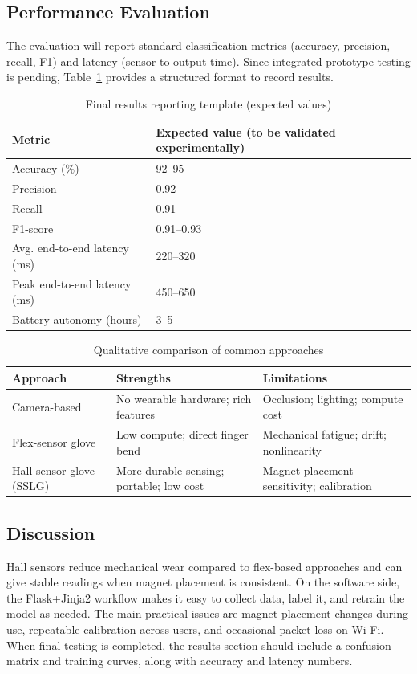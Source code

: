 \documentclass[conference]{IEEEtran}
\begin{document}
\subsection{Performance Evaluation}
The evaluation will report standard classification metrics (accuracy, precision, recall, F1) and latency (sensor-to-output time). Since integrated prototype testing is pending, Table~\ref{tab:metrics} provides a structured format to record results.

\begin{table}[htbp]
    \centering
    \caption{Final results reporting template (expected values)}
    \begin{tabularx}{\columnwidth}{@{}lX@{}}
        \toprule
        Metric & Expected value (to be validated experimentally) \\
        \midrule
        Accuracy (\%) & 92--95 \\
        Precision & 0.92 \\
        Recall & 0.91 \\
        F1-score & 0.91--0.93 \\
        Avg. end-to-end latency (ms) & 220--320 \\
        Peak end-to-end latency (ms) & 450--650 \\
        Battery autonomy (hours) & 3--5 \\
        \bottomrule
    \end{tabularx}
    \label{tab:metrics}
\end{table}

\begin{table}[htbp]
    \centering
    \caption{Qualitative comparison of common approaches}
    \begin{tabularx}{\columnwidth}{@{}lXX@{}}
        \toprule
        Approach & Strengths & Limitations \\
        \midrule
        Camera-based & No wearable hardware; rich features & Occlusion; lighting; compute cost\cite{mitra} \\
        Flex-sensor glove & Low compute; direct finger bend & Mechanical fatigue; drift; nonlinearity \\
        Hall-sensor glove (SSLG) & More durable sensing; portable; low cost & Magnet placement sensitivity; calibration \\
        \bottomrule
    \end{tabularx}
    \label{tab:comparison}
\end{table}

\subsection{Discussion}
Hall sensors reduce mechanical wear compared to flex-based approaches and can give stable readings when magnet placement is consistent. On the software side, the Flask+Jinja2 workflow makes it easy to collect data, label it, and retrain the model as needed. The main practical issues are magnet placement changes during use, repeatable calibration across users, and occasional packet loss on Wi-Fi. When final testing is completed, the results section should include a confusion matrix and training curves, along with accuracy and latency numbers.
\end{document}

